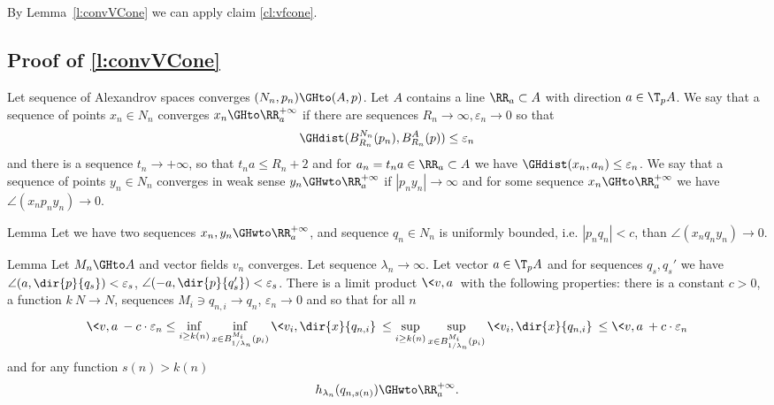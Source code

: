  By Lemma~\ref{l:convVCone} we can apply claim \ref{cl:vfcone}.
\qeds




\subsection{Proof of \ref{l:convVCone}}

Let sequence of Alexandrov spaces converges
$(N_n,p_n)\GHto (A,p)$.
 Let $A$ contains a line $\RR_a\subset A$
 with direction
$a\in \T_p A$.
We say that a sequence of points  $x_n\in N_n$
converges $x_n\GHto\RR_a^{+\infty}$ if
there are sequences $R_n\to\infty,\varepsilon_n\to 0$
so that
$$\GHdist(B^{N_n}_{R_n}(p_n), B^{A}_{R_n}(p))\le\varepsilon_n$$
and there is a sequence $t_n\to+\infty$,
so that
$t_n a\le R_n+2$ and
 for $a_n=t_n a\in \RR_a\subset A$
we have
$\GHdist(x_n,a_n)\le\varepsilon_n$.
We say that a sequence of points  $y_n\in N_n$
converges in weak sense $y_n\GHwto\RR_a^{+\infty}$ if
$|p_n y_n|\to \infty$ and
for some sequence
$x_n\GHto\RR_a^{+\infty}$ we have $\angle (x_n p_n y_n)\to 0$.

\begin{thm}{Lemma}\label{lem:angle}
Let we have two sequences $x_n, y_n\GHwto\RR_a^{+\infty}$,
and  sequence $q_n\in N_n$ is uniformly bounded, i.e. $|p_n q_n|<c$,
than $\angle (x_n q_n y_n)\to 0$.
\end{thm}




\begin{thm}{Lemma} \label{lem:vconvergLoc}
Let $M_n\GHto A$ and vector fields $v_n$ converges.
Let sequence $\lambda_n\to\infty$.
Let vector $a\in \T_p A$
and for sequences $q_s, q_s'$
we have $\angle (a,\dir{p}{q_s})<\varepsilon_s$,
 $\angle (-a,\dir{p}{q'_s})<\varepsilon_s$.
There is a  limit product $\<v,a\>$
with the following properties:
there is a constant $c>0$,
a function $k\: N\to N$,
 sequences
$M_i\ni q_{n,i}\to q_n$, $\varepsilon_n\to 0$
and
so that for   all $n$
$$\<v,a\>- c\cdot \varepsilon_n
\le
\inf_{i\ge k(n)}\inf_{x\in B_{1/\lambda_n}^{M_i}(p_i)} \< v_i,\dir{x}{q_{n,i}}\>
\le
\sup_{i\ge k(n)}\sup_{x\in B_{1/\lambda_n}^{M_i}(p_i)}  \< v_i,\dir{x}{q_{n,i}}\>\le
\<v,a\>+
 c\cdot \varepsilon_n$$
and for any function $s(n)>k(n)$
$$h_{\lambda_n}( q_{n,s(n)})\GHwto\RR_a^{+\infty}.$$

\end{thm}

